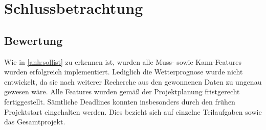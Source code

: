 \section{Schlussbetrachtung}\label{Schlussbetrachtung}

\subsection{Bewertung}\label{subsec:bewertung}
Wie in \autoref{anh:sollist} zu erkennen ist, wurden alle Muss- sowie Kann-Features wurden erfolgreich implementiert.
Lediglich die Wetterprognose wurde nicht entwickelt, da sie nach weiterer Recherche aus den gewonnenen Daten zu ungenau gewesen wäre.
Alle Features wurden gemäß der Projektplanung fristgerecht fertiggestellt.
Sämtliche Deadlines konnten insbesonders durch den frühen Projektstart eingehalten werden.
Dies bezieht sich auf einzelne Teilaufgaben sowie das Gesamtprojekt.

